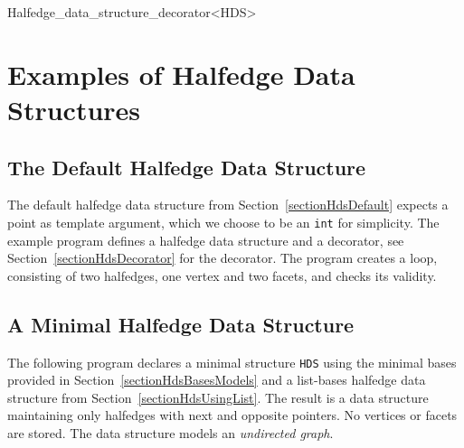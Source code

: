 \begin{ccClassTemplate}{Halfedge_data_structure_decorator<HDS>}


\end{ccClassTemplate}



\clearpage
\section{Examples of Halfedge Data Structures}
\label{sectionHdsExamples}


\subsection{The Default Halfedge Data Structure}

The default halfedge data structure from
Section~\ref{sectionHdsDefault} expects a point as template argument,
which we choose to be an {\tt int} for simplicity. The example program
defines a halfedge data structure and a decorator, see
Section~\ref{sectionHdsDecorator} for the decorator. The program
creates a loop, consisting of two halfedges, one vertex and two
facets, and checks its validity.



\subsection{A Minimal Halfedge Data Structure}

The following program declares a minimal structure {\tt HDS} using the
minimal bases provided in Section~\ref{sectionHdsBasesModels} and a
list-bases halfedge data structure from
Section~\ref{sectionHdsUsingList}. The result is a data structure
maintaining only halfedges with next and opposite pointers.  No
vertices or facets are stored. The data structure models an {\em
  undirected graph}.

